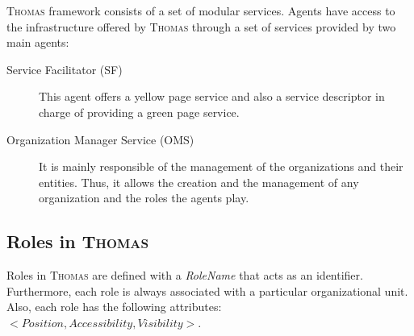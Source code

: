 \textsc{Thomas} framework consists of a set of modular services. Agents have access to the infrastructure offered by \textsc{Thomas} through a set of services provided by two main agents:

\begin{description}
	\item [Service Facilitator (SF)] This agent offers a yellow page service and also a service descriptor in charge of providing a green page service.
	\item [Organization Manager Service (OMS)] It is mainly responsible of the management of the organizations and their entities. Thus, it allows the creation and the management of any organization and the roles the agents play.
\end{description}

\subsection{Roles in \textsc{Thomas}}\label{sec:ThomasRoles}

Roles  in \textsc{Thomas} are defined with a \textit{RoleName} that acts as an identifier. Furthermore, each role is always associated with a particular organizational unit. Also, each role has the following attributes: $<Position, Accessibility, Visibility>$.


